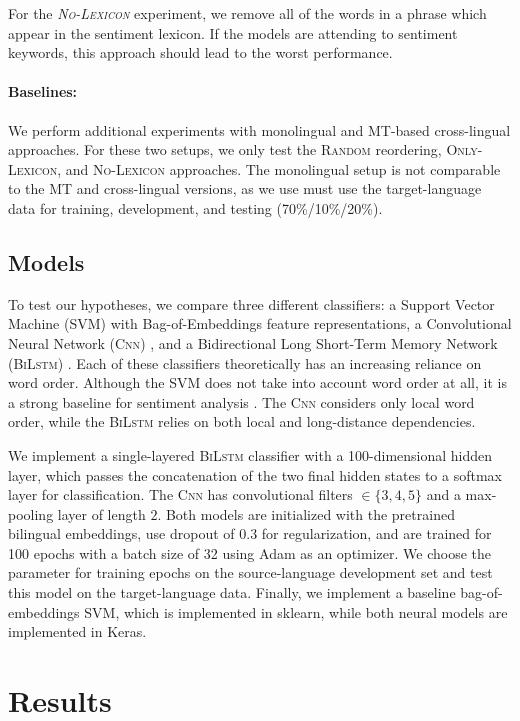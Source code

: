 \documentclass[11pt,a4paper]{article}
\newcommand{\random}{\textsc{Random}\xspace}
\newcommand{\onlylex}{\textsc{Only-Lexicon}\xspace}
\newcommand{\nolex}{\textsc{No-Lexicon}\xspace}
\newcommand{\bilstm}{\textsc{BiLstm}\xspace}
\newcommand{\cnn}{\textsc{Cnn}\xspace}
\begin{document}
For the \emph{\nolex} experiment, we remove all of the words
in a phrase which appear in the sentiment lexicon. If the models are attending to
sentiment keywords, this approach should lead to the worst performance. 

\paragraph{Baselines: }We perform additional experiments with monolingual and MT-based cross-lingual approaches. For these two setups, we only test the \random reordering, \onlylex, and \nolex approaches. The monolingual setup is not comparable to the MT and cross-lingual versions, as we use must use the target-language data for training, development, and testing (70\%/10\%/20\%).

\subsection{Models}

To test our hypotheses, we compare three different classifiers: a Support Vector Machine (SVM) with Bag-of-Embeddings feature representations, a Convolutional Neural Network (\cnn) \cite{Santos2014,Severyn2015}, and a Bidirectional Long Short-Term Memory Network (\bilstm) \cite{Luong2015}. Each of these classifiers theoretically has an increasing reliance on word order. Although the SVM does not take into account word order at all, it is a strong baseline for sentiment analysis \cite{Kiritchenko2014c}. The \cnn considers only local word order, while the \bilstm relies on both local and long-distance dependencies.

We implement a single-layered \bilstm classifier with a 100-dimensional hidden layer, which passes the concatenation of the two final hidden states to a softmax layer for classification. The \cnn has convolutional filters $\in \{3,4,5\}$ and a max-pooling layer of length $2$. Both models are initialized with the pretrained bilingual embeddings, use dropout of $0.3$ for regularization, and are trained for 100 epochs with a batch size of 32 using Adam as an optimizer. We choose the parameter for training epochs on the source-language development set and test this model on the target-language data. Finally, we implement a baseline bag-of-embeddings SVM, which is implemented in sklearn, while both neural models are implemented in Keras.

\section{Results}
\end{document}
